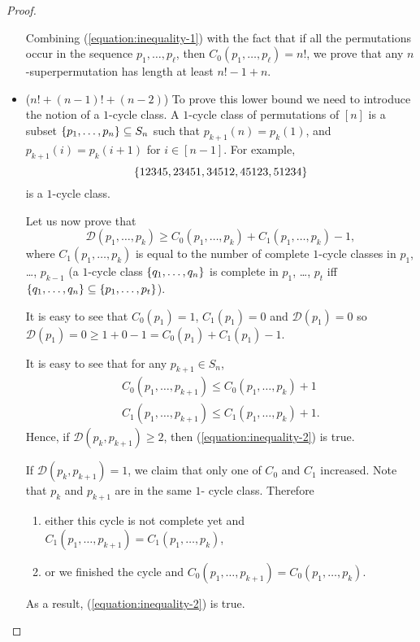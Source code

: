 \begin{proof}
\begin{itemize}
      Combining (\ref{equation:inequality-1}) with the fact that if all the
      permutations occur in the sequence $p_1, \dots, p_\ell$, then
      $C_0(p_1, \dots, p_\ell) = n!$,
      we prove that any $n$-superpermutation has length at least $n! - 1 + n$.
    \item ($n! + (n - 1)! + (n - 2)$)
      To prove this lower bound we need to introduce the notion of a $1$-cycle
      class. A $1$-cycle class of permutations of $[n]$ is a
      subset $\set{p_1, \dots, p_n} \subseteq S_n$ such that $p_{k + 1}(n) =
      p_k(1)$, and $p_{k + 1}(i) = p_k(i + 1)$ for $i \in [n - 1]$. For
      example,
      \[
        \set{12345, 23451, 34512, 45123, 51234}
      \]
      is a $1$-cycle class.

      Let us now prove that
      \begin{equation}
        \label{equation:inequality-2}
        \mathcal{D}(p_1, \dots, p_k) \ge
        C_0(p_1, \dots, p_k) + C_1(p_1, \dots, p_k) - 1,
      \end{equation}
      where $C_1(p_1, \dots, p_k)$ is equal to the number of complete $1$-cycle
      classes in $p_1$, \dots, $p_{k - 1}$ (a $1$-cycle class
      $\set{q_1, \dots, q_n}$ is complete in $p_1$, \dots, $p_t$ iff
      $\set{q_1, \dots, q_n} \subseteq \set{p_1, \dots, p_t}$).

      It is easy to see that $C_0(p_1) = 1$, $C_1(p_1) = 0$ and
      $\mathcal{D}(p_1) = 0$ so
      $\mathcal{D}(p_1) = 0 \ge 1 + 0 - 1 = C_0(p_1) + C_1(p_1) - 1$.

      It is easy to see that for any $p_{k + 1} \in S_n$,
      \begin{gather*}
        C_0(p_1, \dots, p_{k + 1}) \le C_0(p_1, \dots, p_k) + 1  \\
        C_1(p_1, \dots, p_{k + 1}) \le C_1(p_1, \dots, p_k) + 1.
      \end{gather*}
      Hence, if $\mathcal{D}(p_k, p_{k + 1}) \ge 2$, then
      (\ref{equation:inequality-2}) is true.

      If $\mathcal{D}(p_k, p_{k + 1}) = 1$, we claim that only one of $C_0$ and
      $C_1$ increased. Note that $p_k$ and $p_{k + 1}$ are in the same $1$-
      cycle class. Therefore
      \begin{enumerate}
        \item either this cycle is not complete yet and
          $C_1(p_1, \dots, p_{k + 1}) = C_1(p_1, \dots, p_k)$,
        \item or we finished the cycle and
          $C_0(p_1, \dots, p_{k + 1}) = C_0(p_1, \dots, p_k)$.
      \end{enumerate}
      As a result, (\ref{equation:inequality-2}) is true.


\end{itemize}
\end{proof}
